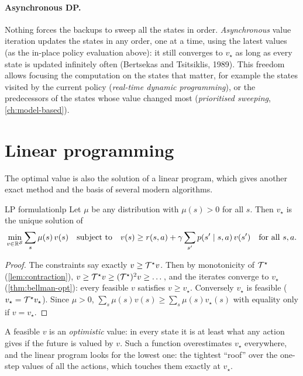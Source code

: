 \paragraph{Asynchronous DP.} Nothing forces the backups to sweep all the
states in order. \emph{Asynchronous} value iteration updates the states in
any order, one at a time, using the latest values (as the in-place policy
evaluation above): it still converges to $v_\star$ as long as every state is
updated infinitely often (Bertsekas and Tsitsiklis, 1989). This freedom
allows focusing the computation on the states that matter, for example the
states visited by the current policy (\emph{real-time dynamic
programming}), or the predecessors of the states whose value changed most
(\emph{prioritised sweeping}, \cref{ch:model-based}).

\section{Linear programming}

The optimal value is also the solution of a linear program, which gives
another exact method and the basis of several modern algorithms.

\begin{theorem}{LP formulation}{lp}
  Let $\mu$ be any distribution with $\mu(s) > 0$ for all $s$. Then
  $v_\star$ is the unique solution of
  \begin{equation}
    \label{eq:lp}
    \min_{v \in \mathbb{R}^{\mathcal{S}}} \sum_s \mu(s)\, v(s) \quad
    \text{subject to} \quad v(s) \geq r(s, a) + \gamma \sum_{s'} p(s' \mid
    s, a)\, v(s') \quad \text{for all } s, a.
  \end{equation}
\end{theorem}

\begin{proof}
  The constraints say exactly $v \geq \mathcal{T}^\star v$. Then by monotonicity of
  $\mathcal{T}^\star$ (\cref{lem:contraction}), $v \geq \mathcal{T}^\star v \geq
  (\mathcal{T}^\star)^2 v \geq \dots$, and the iterates converge to $v_\star$
  (\cref{thm:bellman-opt}): every feasible $v$ satisfies $v \geq v_\star$.
  Conversely $v_\star$ is feasible ($v_\star = \mathcal{T}^\star v_\star$). Since
  $\mu > 0$, $\sum_s \mu(s) v(s) \geq \sum_s \mu(s) v_\star(s)$ with
  equality only if $v = v_\star$.
\end{proof}

\begin{intuition}
  A feasible $v$ is an \emph{optimistic} value: in every state it is at
  least what any action gives if the future is valued by $v$. Such a
  function overestimates $v_\star$ everywhere, and the linear program looks
  for the lowest one: the tightest ``roof'' over the one-step values of all
  the actions, which touches them exactly at $v_\star$.
\end{intuition}


